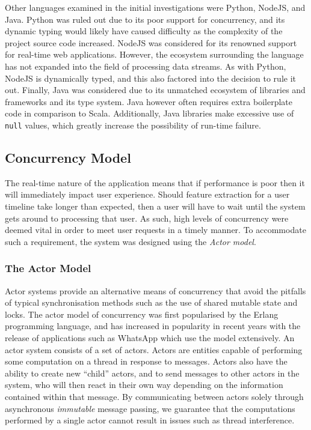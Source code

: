 \documentclass{l4proj}
\newcommand{\code}[1]{\texttt{#1}}
\begin{document}
        Other languages examined in the initial investigations were Python, NodeJS, and Java. Python was ruled out due to its poor support for concurrency, and its dynamic typing would likely have caused difficulty as the complexity of the project source code increased. NodeJS was considered for its renowned support for real-time web applications. However, the ecosystem surrounding the language has not expanded into the field of processing data streams. As with Python, NodeJS is dynamically typed, and this also factored into the decision to rule it out. Finally, Java was considered due to its unmatched ecosystem of libraries and frameworks and its type system. Java however often requires extra boilerplate code in comparison to Scala. Additionally, Java libraries make excessive use of \code{null} values, which greatly increase the possibility of run-time failure.
        

    \subsection{Concurrency Model}
    
    The real-time nature of the application means that if performance is poor then it will immediately impact user experience. Should feature extraction for a user timeline take longer than expected, then a user will have to wait until the system gets around to processing that user. As such, high levels of concurrency were deemed vital in order to meet user requests in a timely manner. To accommodate such a requirement, the system was designed using the \textit{Actor model}.
    
    \subsubsection{The Actor Model}

Actor systems provide an alternative means of concurrency that avoid the pitfalls of typical synchronisation methods such as the use of shared mutable state and locks. The actor model of concurrency was first popularised by the Erlang programming language, and has increased in popularity in recent years with the release of applications such as WhatsApp which use the model extensively. An actor system consists of a set of actors. Actors are entities capable of performing some computation on a thread in response to messages. Actors also have the ability to create new “child” actors, and to send messages to other actors in the system, who will then react in their own way depending on the information contained within that message. By communicating between actors solely through asynchronous \textit{immutable} message passing, we guarantee that the computations performed by a single actor cannot result in issues such as thread interference.
\end{document}
